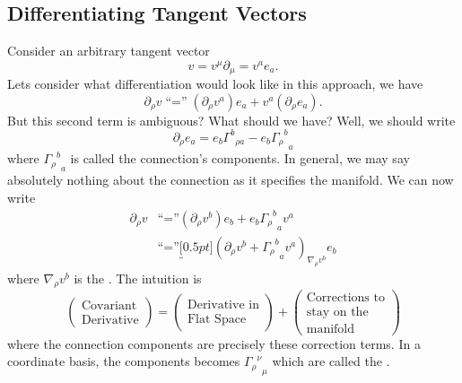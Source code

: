 \subsection{Differentiating Tangent Vectors}
Consider an arbitrary tangent vector
\begin{equation}
v=v^{\mu}\partial_{\mu}=v^{a}e_{a}.
\end{equation}
Lets consider what differentiation would look like in this
approach, we have
\begin{equation}
\partial_{\rho}v\;\mbox{``=''}\;(\partial_{\rho}v^{a})e_{a}+v^{a}(\partial_{\rho}e_{a}).
\end{equation}
But this second term is ambiguous? What should we have? Well, we
should write
\begin{equation}
\partial_{\rho}e_{a}=e_{b}{\Gamma^{b}}_{\rho a}-e_{b}{{\Gamma_{\rho}}^{b}}_{a}
\end{equation}
where ${{\Gamma_{\rho}}^{b}}_{a}$ is called the connection's components.
In general, we may say absolutely nothing about the connection as
it specifies the manifold. We can now write
\begin{equation}
\begin{split}
\partial_{\rho}v
&\mbox{``=''}(\partial_{\rho}v^{b})e_{b}+e_{b}{{\Gamma_{\rho}}^{b}}_{a}v^{a}\\
&\mbox{``=''}\underbracket[0.5pt]{(\partial_{\rho}v^{b}+{{\Gamma_{\rho}}^{b}}_{a}v^{a})}_{\nabla_{\rho}v^{b}}e_{b}
\end{split}
\end{equation}
where $\nabla_{\rho}v^{b}$ is the . 
The intuition is
\begin{equation}
\begin{pmatrix}
\mbox{Covariant}\\
\mbox{Derivative}
\end{pmatrix}=\begin{pmatrix}
\mbox{Derivative in}\\
\mbox{Flat Space}
\end{pmatrix}
+\begin{pmatrix}
\mbox{Corrections to}\\
\mbox{stay on the}\\\mbox{manifold}
\end{pmatrix}
\end{equation}
where the connection components are precisely these correction
terms. In a coordinate basis, the components becomes
${{\Gamma_{\rho}}^{\nu}}_{\mu}$ which are called the
.
